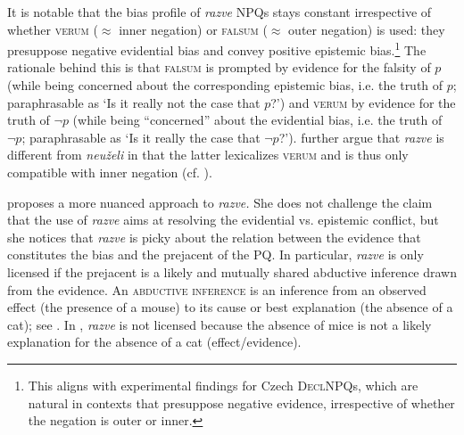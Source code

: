 \documentclass[output=paper,colorlinks,citecolor=brown]{langscibook}
\begin{document}
\noindent It is notable that the bias profile of \textit{razve} NPQs stays constant irrespective of whether \textsc{verum} ($\approx$ inner negation) or \textsc{falsum} ($\approx$ outer negation) is used: they presuppose negative evidential bias and convey positive epistemic bias.\footnote{This aligns with  experimental findings for Czech \textsc{DeclNPQ}s, which are natural in contexts that presuppose negative evidence, irrespective of whether the negation is outer or inner.} The rationale behind this is that \textsc{falsum} is prompted by evidence for the falsity of $p$ (while being concerned about the corresponding epistemic bias, i.e. the truth of $p$; paraphrasable as `Is it really not the case that $p$?') and \textsc{verum} by evidence for the truth of $\neg p$ (while being ``concerned'' about the evidential bias, i.e. the truth of $\neg p$; paraphrasable as `Is it really the case that $\neg p$?'). \citet{Repp.Geist2025} further argue that \textit{razve} is different from \textit{neuželi} in that the latter lexicalizes \textsc{verum} and is thus only compatible with inner negation (cf. \citealt{Bulygina.Smelev1987}).

\largerpage
\citet{Korotkova2023} proposes a more nuanced approach to \textit{razve.} She does not challenge the claim that the use of \textit{razve} aims at resolving the evidential vs. epistemic conflict, but she notices that \textit{razve} is picky about the relation between the evidence that constitutes the bias and the prejacent of the PQ. In particular, \textit{razve} is only licensed if the prejacent is a likely and mutually shared abductive inference drawn from the evidence. An \textsc{abductive inference} \citep{Douven2021} is an inference from an observed effect (the presence of a mouse) to its cause or best explanation (the absence of a cat); see . In , \textit{razve} is not licensed because the absence of mice is not a likely explanation for the absence of a cat (effect/evidence).
\end{document}
